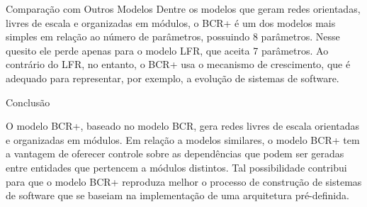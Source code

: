 \begin{section}{Comparação com Outros Modelos}
	\vspace{8 mm}
	Dentre os modelos que geram redes orientadas, livres de escala e organizadas em módulos, o BCR+ é um dos modelos mais simples em relação ao número de parâmetros, possuindo 8 parâmetros. Nesse quesito ele perde apenas para o modelo LFR, que aceita 7 parâmetros. Ao contrário do LFR, no entanto, o BCR+ usa o mecanismo de crescimento, que é adequado para representar, por exemplo, a evolução de sistemas de software.


	
\end{section}

\begin{section}{Conclusão}
	
	O modelo BCR+, baseado no modelo BCR, gera redes livres de escala orientadas e organizadas em módulos. Em relação a modelos similares, o modelo BCR+ tem a vantagem de oferecer controle sobre as dependências que podem ser geradas entre entidades que pertencem a módulos distintos. Tal possibilidade contribui para que o modelo BCR+ reproduza melhor o processo de construção de sistemas de software que se baseiam na implementação de uma arquitetura pré-definida.
	
\end{section}